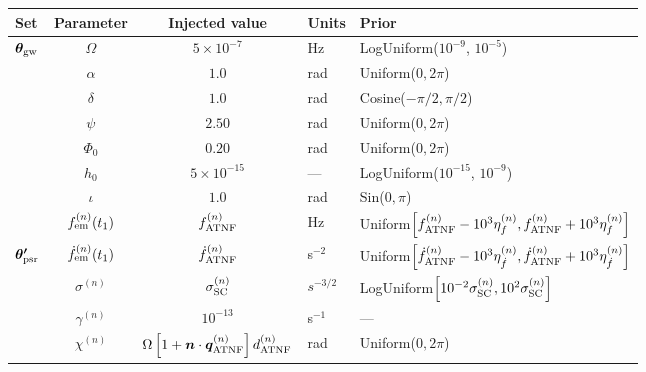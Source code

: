 \documentclass[fleqn,usenatbib,useAMS]{mnras}
\begin{document}
\begin{table}
	\centering
		\begin{tabular}{lccll}
			\toprule
			Set&Parameter & Injected value & Units & Prior  \\
			\hline
			\multirow{7}{2mm}{$\boldsymbol{\theta}_{\rm gw}$} & $\Omega$       & $5 \times 10^{-7}$ & Hz & LogUniform($10^{-9}$, $10^{-5}$) \\
			& $\alpha$          & $1.0$  & rad & Uniform($0, 2 \pi $)\\
			& $\delta$              & $1.0$  & rad & Cosine($-\pi/2, \pi/2$) \\
			& $\psi$              & $2.50$ & rad & Uniform($0, 2 \pi $) \\
			& $\Phi_0$          & $0.20$ & rad & Uniform($0, 2 \pi $) \\
			& $h_0$            & $5 \times 10^{-15}$ & --- & LogUniform($10^{-15}$, $10^{-9}$) \\
			& $\iota$             & $1.0$ & rad & Sin($0, \pi$) \\ 
			\hline
			\vspace{1mm}& $f_{\rm em}^{(n)} (t_1)$       & $f_{\rm ATNF}^{(n)}$ & Hz & Uniform$\left[f_{\rm ATNF}^{(n)} - 10^3 \eta^{(n)}_{f}, f_{\rm ATNF}^{(n)} + 10^3 \eta^{(n)}_{f} \right]$ \\
      \multirow{2}{2mm}{$\boldsymbol{\theta'}_{\rm psr}$} & $\dot{f}_{\rm em}^{(n)} (t_1)$       & $\dot{f}_{\rm ATNF}^{(n)}$ & s$^{-2}$ & Uniform$\left[ \dot{f}_{\rm ATNF}^{(n)} - 10^3 \eta^{(n)}_{\dot{f}}, \dot{f}_{\rm ATNF}^{(n)} + 10^3 \eta^{(n)}_{\dot{f}} \right]$ \\
		     & $\sigma^{(n)}$              & $\sigma_{\rm SC}^{(n)}$ & $s^{-3/2}$ & LogUniform$ \left [10^{-2} \sigma_{\rm SC}^{(n)}, 10^2 \sigma_{\rm SC}^{(n)} \right ]$ \\
			& $\gamma^{(n)}$              & $10^{-13}$ & s$^{-1}$ & --- \\
			\vspace{1mm} &  $\chi^{(n)}$       &$\Omega \left[ 1 + \boldsymbol{n}\cdot \boldsymbol{q}^{(n)}_{\rm ATNF} \right]  d_{\rm ATNF}^{(n)} $  & rad & Uniform($0, 2 \pi $) \\
			\bottomrule
		\end{tabular}

\end{table}
\end{document}
